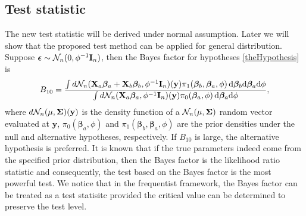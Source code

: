 \documentclass[smallextended]{svjour3}       %
\newcommand{\By}{\mathbf{y}}    \newcommand{\Bz}{\mathbf{z}}
\newcommand{\bfsym}[1]{\ensuremath{\boldsymbol{#1}}}
\def\bbeta{\bfsym \beta}
\begin{document}
\subsection{Test statistic}
The new test statistic will be derived under normal assumption.
Later we will show that the proposed test method can be applied for general distribution.
Suppose $\bepsilon \sim \mathcal N_n (0,\phi^{-1} \BI_n)$, then the Bayes factor for hypotheses \eqref{theHypothesis} is
\begin{equation*}
    B_{10}= \frac {
        \int d\mathcal N_n(\BX_a\bbeta_a + \BX_b\bbeta_b, \phi^{-1}\BI_n) (\By) \pi_1(\bbeta_b,\bbeta_a,\phi)\, \mathrm d\bbeta_b \mathrm d\bbeta_a \mathrm d\phi
}{
    \int d\mathcal N_n(\BX_a\bbeta_a, \phi^{-1} \BI_n)(\By) \pi_0(\bbeta_a,\phi) \, \mathrm d\bbeta_a \mathrm d\phi
    },
\end{equation*}
where $d\mathcal N_n(\mu, \bSigma)(\By)$ is the density function of a $\mathcal N_n(\mu,\bSigma) $ random vector evaluated at $\By$,  $\pi_0(\bbeta_a,\phi)$ and $\pi_1(\bbeta_b,\bbeta_a,\phi)$ are the prior densities under the null and alternative hypotheses, respectively.
If $B_{10}$ is large, the alternative hypothesis is preferred.
It is known that if the true parameters indeed come from the specified prior distribution, then the Bayes factor is the likelihood ratio statistic and consequently, the test based on the Bayes factor is the most powerful test.
We notice that in the frequentist framework, the Bayes factor can be treated as a test statisitc provided the critical value can be determined to preserve the test level.
\end{document}

